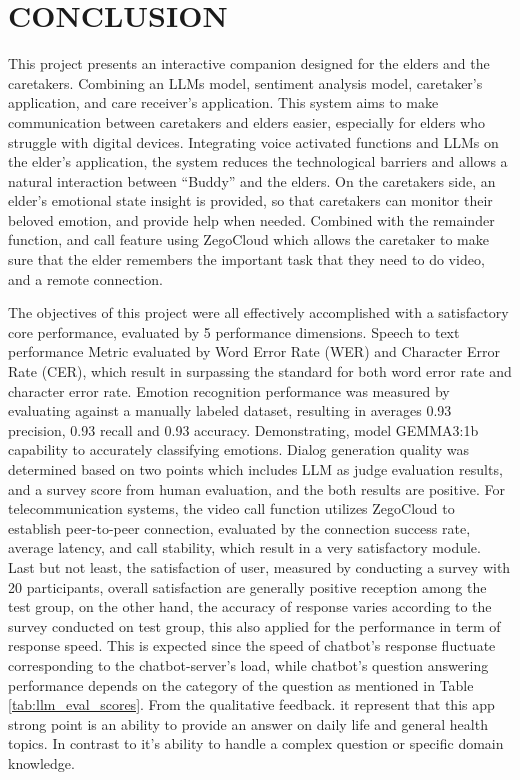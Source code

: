 
\chapter{CONCLUSION}
{ 
	\setlength{\leftskip}{1cm}
	\setlength{\parindent}{2.5em}
	This project presents an interactive companion designed for the elders and the caretakers. Combining an LLMs model, sentiment analysis model, caretaker’s application, and care receiver’s application. This system aims to make communication between caretakers and elders easier, especially for elders who struggle with digital devices. Integrating voice activated functions and LLMs on the elder’s application, the system reduces the technological barriers and allows a natural interaction between “Buddy” and the elders. On the caretakers side, an elder's emotional state insight is provided, so that caretakers can monitor their beloved emotion, and provide help when needed. Combined with the remainder function, and call feature using ZegoCloud which allows the caretaker to make sure that the elder remembers the important task that they need to do video, and a remote connection. 
	\par
}

{ 
	\setlength{\leftskip}{1cm}
	\setlength{\parindent}{2.5em}
	The objectives of this project were all effectively accomplished with a satisfactory core performance, evaluated by 5 performance dimensions. Speech to text performance Metric evaluated by Word Error Rate (WER) and Character Error Rate (CER), which result in surpassing the standard for both word error rate and character error rate. Emotion recognition performance was measured by evaluating against a manually labeled dataset, resulting in averages 0.93 precision, 0.93 recall and 0.93 accuracy. Demonstrating, model GEMMA3:1b capability to accurately classifying emotions. Dialog generation quality was determined based on two points which includes LLM as judge evaluation results, and a survey score from human evaluation, and the both results are positive. For telecommunication systems, the video call function utilizes ZegoCloud to establish peer-to-peer connection, evaluated by the connection success rate, average latency, and call stability, which result in a very satisfactory module. Last but not least, the satisfaction of user, measured by conducting a survey with 20 participants, overall satisfaction are generally positive reception among the test group, on the other hand, the accuracy of response varies according to the survey conducted on test group, this also applied for the performance in term of response speed. This is expected since the speed of chatbot's response fluctuate corresponding to the chatbot-server's load, while chatbot's question answering performance depends on the category of the question as mentioned in Table \ref{tab:llm_eval_scores}. From the qualitative feedback. it represent that this app strong point is an ability to provide an answer on daily life and general health topics. In contrast to it's ability to handle a complex question or specific domain knowledge.
	\par
}

